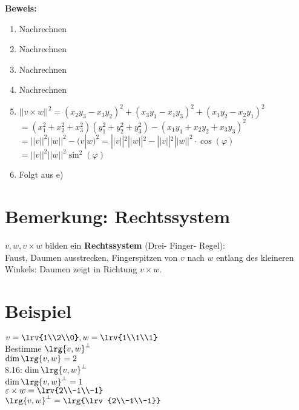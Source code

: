	\textbf{Beweis:}
	\begin{enumerate}
		\item Nachrechnen
		\item Nachrechnen
		\item Nachrechnen
		\item Nachrechnen
		\item $ ||v\times w||^2=(x_2y_3-x_3y_2)^2+(x_3y_1-x_1y_3)^2+(x_1y_2-x_2y_1)^2 $\\
		$ =(x_1^2+x_2^2+x_3^2)(y_1^2+y_2^2+y_3^2)-(x_1y_1+x_2y_2+x_3y_3)^2 $\\
		$ = ||v||^2 ||w||^2-(v|w)^2=||v||^2||w||^2-||v||^2||w||^2\cdot\cos(\varphi) $\\
		$ = ||v||^2||w||^2\sin^2(\varphi)$
		\item Folgt aus e)
	\end{enumerate}

\section{Bemerkung: Rechtssystem}
	$ v,w,v\times w $ bilden ein \textbf{Rechtssystem} (Drei- Finger- Regel):\\
	Faust, Daumen ausstrecken, Fingerspitzen von $ v $ nach $ w $ entlang des kleineren Winkels: Daumen zeigt in Richtung $ v\times w $.

\section{Beispiel}
	$ v=\lrv{1\\2\\0},w=\lrv{1\\1\\1} $\\
	Bestimme $ \lrg{v,w}^\perp $\\
	$ \dim\lrg{v,w}=2 $\\
	8.16: $ \dim\lrg{v,w}^\perp $\\
	$ \dim\lrg{v,w}^\perp=1 $\\
	$ \varepsilon\times w=\lrv{2\\-1\\-1} $\\
	$ \lrg{v,w}^\perp=\lrg{\lrv{2\\-1\\-1}} $
